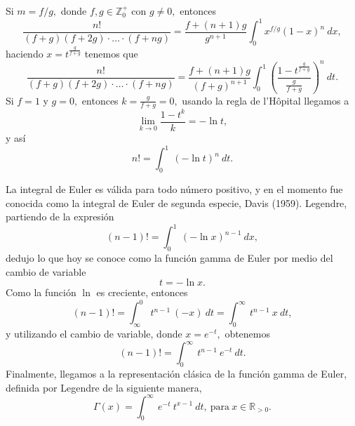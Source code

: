 Si $m = f/g,$ donde $f,g \in \mathbb{Z}_0^+$ con $g \neq 0,$ entonces
$$\frac{n!}{(f+g)(f+2g) \cdot \ldots \cdot (f+ng)} = \frac{f+(n+1)g}{g^{n+1}}\int_{0}^{1}x^{f/g}(1-x)^n\ dx,$$ haciendo $x = t^{\frac{g}{f+g}}$ tenemos que
$$\frac{n!}{(f+g)(f+2g) \cdot \ldots \cdot (f+ng)} = \frac{f+(n+1)g}{(f+g)^{n+1}}\int_{0}^{1}\left(\frac{1-t^{\frac{g}{f+g}}}{\tfrac{g}{f+g}}\right)^n\ dt.$$ Si $f = 1$ y $g = 0,$ entonces $k = \frac{g}{f+g} = 0,$ usando la regla de l'Hôpital llegamos a $$\lim_{k \rightarrow 0} \frac{1-t^k}{k} = -\ln t,$$ y así
$$n! = \int_{0}^{1}\ (-\ln t)^n\ dt.$$

La integral de Euler es válida para todo número positivo, y en el momento fue conocida como la integral de Euler de segunda especie, Davis (1959). Legendre, partiendo de la expresión $$(n-1)! = \int_{0}^{1}\ (-\ln x)^{n-1}\ dx,$$ dedujo lo que hoy se conoce como la función gamma de Euler por medio del cambio de variable $$t = -\ln x.$$ Como la función $\ln$ es creciente, entonces
$$(n-1)! = \int_{\infty}^{0}\ t^{n-1}\ (-x)\ dt = \int_{0}^{\infty}\ t^{n-1}\ x\ dt,$$ y utilizando el cambio de variable, donde $x = e^{-t},$ obtenemos $$(n-1)! = \int_{0}^{\infty}\ t^{n-1}\ e^{-t}\ dt.$$ Finalmente, llegamos a la representación clásica de la función gamma de Euler, definida por Legendre de la siguiente manera, $$\Gamma (x) = \int_{0}^{\infty}\  e^{-t}\ t^{x-1}\ dt,\ \textrm{para}\ x \in \mathbb{R}_{>0}.$$
\endinput